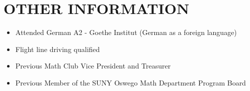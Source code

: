 \documentclass[paper=a4,fontsize=11pt]{scrartcl} %
\newcommand{\NewPart}[1]{\section*{\uppercase{#1}}}
\begin{document}
\NewPart{\normalsize Other Information}{}
\begin{itemize}
\setlength\itemsep{-.15cm}
\item[] Attended German A2 - Goethe Institut \footnotesize(German as a foreign language)\normalsize
\item[] Flight line driving qualified
\item[] Previous Math Club Vice President and Treasurer
\item[] Previous Member of the SUNY Oswego Math Department Program Board
\end{itemize}
\end{document}
